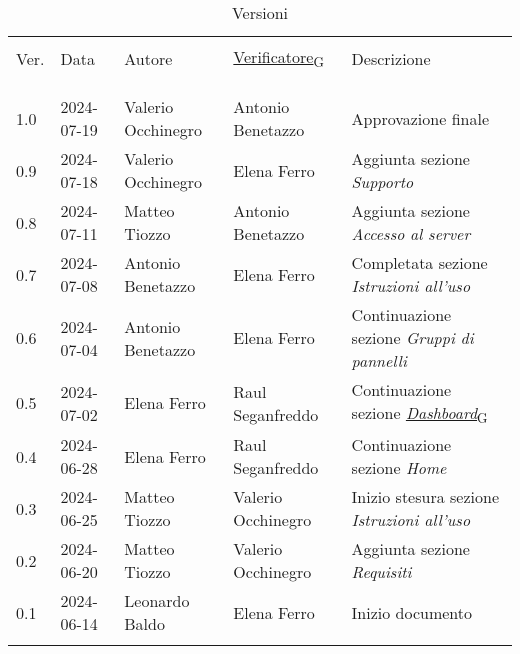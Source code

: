 \documentclass[italian,12pt]{article}
\begin{document}

\newpage


\begin{table}[!h]
    \footnotesize
    \begin{center}
        \caption*{Versioni}
        \vspace{0.5cm}
        \begin{tabular}{l l l l p{6cm}}
            \hline\\[-2ex]
            Ver. & Data       & Autore             & \href{https://7last.github.io/docs/pb/documentazione-interna/glossario\#verificatore}{Verificatore\textsubscript{G}}       & Descrizione\\\\[-2ex] \hline \\[-1.5ex]\\
            1.0  & 2024-07-19 & Valerio Occhinegro & Antonio Benetazzo  & Approvazione finale \\
            0.9  & 2024-07-18 & Valerio Occhinegro & Elena Ferro        & Aggiunta sezione \textit{Supporto} \\
            0.8  & 2024-07-11 & Matteo Tiozzo      & Antonio Benetazzo  & Aggiunta sezione \textit{Accesso al server}\\
            0.7  & 2024-07-08 & Antonio Benetazzo  & Elena Ferro        & Completata sezione \textit{Istruzioni all'uso} \\
            0.6  & 2024-07-04 & Antonio Benetazzo  & Elena Ferro        & Continuazione sezione \textit{Gruppi di pannelli} \\
            0.5  & 2024-07-02 & Elena Ferro        & Raul Seganfreddo   & Continuazione sezione \href{https://7last.github.io/docs/pb/documentazione-interna/glossario\#dashboard}{\textit{Dashboard}\textsubscript{G}} \\
            0.4  & 2024-06-28 & Elena Ferro        & Raul Seganfreddo   & Continuazione sezione \textit{Home} \\
            0.3  & 2024-06-25 & Matteo Tiozzo      & Valerio Occhinegro & Inizio stesura sezione \textit{Istruzioni all'uso} \\
            0.2  & 2024-06-20 & Matteo Tiozzo      & Valerio Occhinegro & Aggiunta sezione \textit{Requisiti} \\
            0.1  & 2024-06-14 & Leonardo Baldo     & Elena Ferro        & Inizio documento \\
            \\[-1.5ex] \hline
        \end{tabular}
    \end{center}
\end{table}

\newpage
\tableofcontents
\newpage
\listoffigures
\newpage




\end{document}
